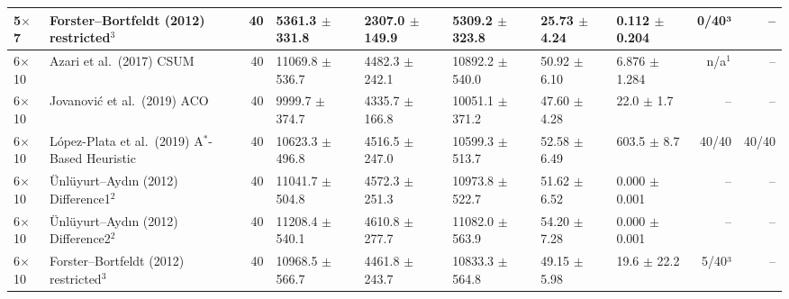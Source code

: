 \begin{table}[htbp]
\begin{tabular}{llrlllllrr}
5$\times$7 & Forster--Bortfeldt (2012) restricted$^{3}$ & 40 & 5361.3 $\pm$ 331.8 & 2307.0 $\pm$ 149.9 & 5309.2 $\pm$ 323.8 & 25.73 $\pm$ 4.24 & 0.112 $\pm$ 0.204 & 0/40³ & -- \\
\midrule
6$\times$10 & Azari et al.\ (2017) CSUM & 40 & 11069.8 $\pm$ 536.7 & 4482.3 $\pm$ 242.1 & 10892.2 $\pm$ 540.0 & 50.92 $\pm$ 6.10 & 6.876 $\pm$ 1.284 & n/a$^{1}$ & -- \\
6$\times$10 & Jovanovi\'{c} et al.\ (2019) ACO & 40 & 9999.7 $\pm$ 374.7 & 4335.7 $\pm$ 166.8 & 10051.1 $\pm$ 371.2 & 47.60 $\pm$ 4.28 & 22.0 $\pm$ 1.7 & -- & -- \\
6$\times$10 & L\'{o}pez-Plata et al.\ (2019) A$^\ast$-Based Heuristic & 40 & 10623.3 $\pm$ 496.8 & 4516.5 $\pm$ 247.0 & 10599.3 $\pm$ 513.7 & 52.58 $\pm$ 6.49 & 603.5 $\pm$ 8.7 & 40/40 & 40/40 \\
6$\times$10 & \"{U}nl\"{u}yurt--Ayd\i{}n (2012) Difference1$^{2}$ & 40 & 11041.7 $\pm$ 504.8 & 4572.3 $\pm$ 251.3 & 10973.8 $\pm$ 522.7 & 51.62 $\pm$ 6.52 & 0.000 $\pm$ 0.001 & -- & -- \\
6$\times$10 & \"{U}nl\"{u}yurt--Ayd\i{}n (2012) Difference2$^{2}$ & 40 & 11208.4 $\pm$ 540.1 & 4610.8 $\pm$ 277.7 & 11082.0 $\pm$ 563.9 & 54.20 $\pm$ 7.28 & 0.000 $\pm$ 0.001 & -- & -- \\
6$\times$10 & Forster--Bortfeldt (2012) restricted$^{3}$ & 40 & 10968.5 $\pm$ 566.7 & 4461.8 $\pm$ 243.7 & 10833.3 $\pm$ 564.8 & 49.15 $\pm$ 5.98 & 19.6 $\pm$ 22.2 & 5/40³ & -- \\
\bottomrule
\end{tabular}

\end{table}
